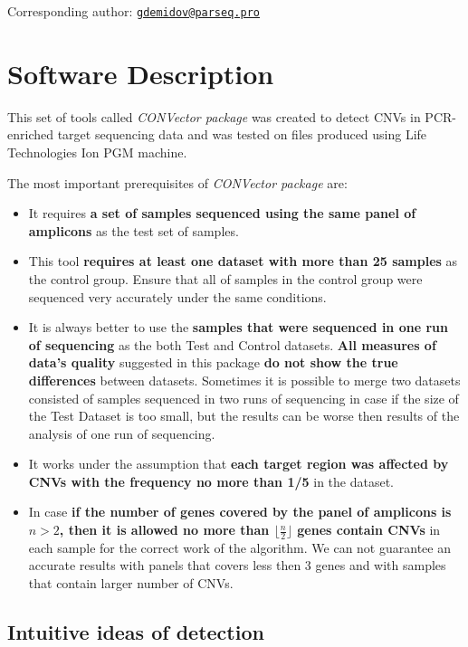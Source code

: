 \documentclass{article}
\begin{document}
Corresponding author: \href{mailto:gdemidov@parseq.pro}{\nolinkurl{gdemidov@parseq.pro}}


\newpage
\section{Software Description}

This set of tools called {\it CONVector package} was created to detect CNVs in PCR-enriched target sequencing data and was tested on files produced using Life Technologies Ion{\texttrademark} PGM machine.

The most important prerequisites of {\it CONVector package} are:

\begin{itemize}
\item It requires {\bf a set of samples sequenced using the same panel of amplicons} as the test set of samples.
\item This tool {\bf requires at least one dataset with more than 25 samples} as the control group. Ensure that all of samples in the control group were sequenced very accurately under the same conditions.
\item It is always better to use the {\bf samples that were sequenced in one run of sequencing} as the both Test and Control datasets. {\bf All measures of data's quality} suggested in this package {\bf do not show the true differences} between datasets. Sometimes it is possible to merge two datasets consisted of samples sequenced in two runs of sequencing in case if the size of the Test Dataset is too small, but the results can be worse then results of the analysis of one run of sequencing.
\item It works under the assumption that {\bf each target region was affected by CNVs with the frequency no more than 1/5} in the dataset.
\item In case {\bf if the number of genes covered by the panel of amplicons is $n > 2$, then it is allowed no more than $\lfloor \frac{n}{2} \rfloor$ genes contain CNVs} in each sample for the correct work of the algorithm. We can not guarantee an accurate results with panels that covers less then 3 genes and with samples that contain larger number of CNVs.
\end{itemize}



\subsection{Intuitive ideas of detection}
\end{document}
